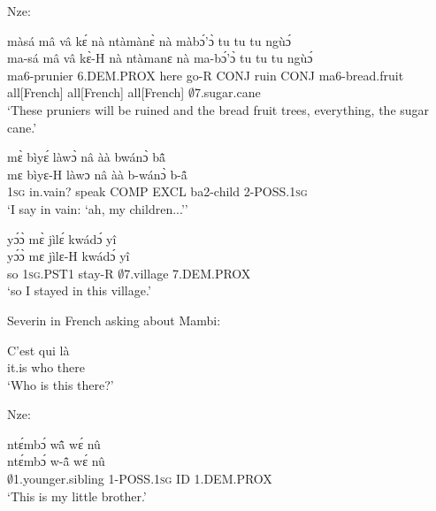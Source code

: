 \noindent Nze:

\begin{exe} 
\exC\label{82}
  \glll  màsá mâ vâ kɛ́ nà ntàmànɛ̀ nà màbɔ́'ɔ̀ tu tu tu ngùɔ́ \\
          ma-sá mâ vâ kɛ̀-H nà ntàmanɛ nà ma-bɔ́'ɔ̀ tu tu tu ngùɔ́ \\
          ma6-prunier 6.DEM.PROX here go-R CONJ ruin CONJ ma6-bread.fruit all[French] all[French] all[French] $\emptyset$7.sugar.cane\\ 
    \trans `These pruniers will be ruined and the bread fruit trees, everything, the sugar cane.'
\end{exe}

\begin{exe} 
\exC\label{83}
  \glll   mɛ̀ bìyɛ́ làwɔ̀ nâ àà bwánɔ̀ bã̂ \\
           mɛ bìyɛ-H làwɔ nâ àà b-wánɔ̀ b-ã̂ \\
          1\textsc{sg} in.vain? speak COMP EXCL ba2-child 2-POSS.1\textsc{sg} \\
    \trans `I say in vain: `ah, my children...''
\end{exe}

\begin{exe} 
\exC\label{84} 
  \glll  yɔ́ɔ̀ mɛ̀ jìlɛ́ kwádɔ́ yî \\
         yɔ́ɔ̀ mɛ jìlɛ-H kwádɔ́ yî \\
          so 1\textsc{sg}.PST1 stay-R $\emptyset$7.village 7.DEM.PROX  \\
    \trans `so I stayed in this village.'
\end{exe}

\noindent Severin in French asking about Mambi:

\begin{exe} 
\exC\label{85}
  \gll  C'est qui là  \\
          it.is who there  \\
    \trans `Who is this there?'
\end{exe}

\noindent Nze:

\begin{exe} 
\exC\label{86} 
  \glll  ntɛ́mbɔ́ wã̂ wɛ́ nû \\
       ntɛ́mbɔ́ w-ã̂ wɛ́ nû \\
          $\emptyset$1.younger.sibling 1-POSS.1\textsc{sg} ID 1.DEM.PROX  \\
    \trans `This is my little brother.'
\end{exe}

